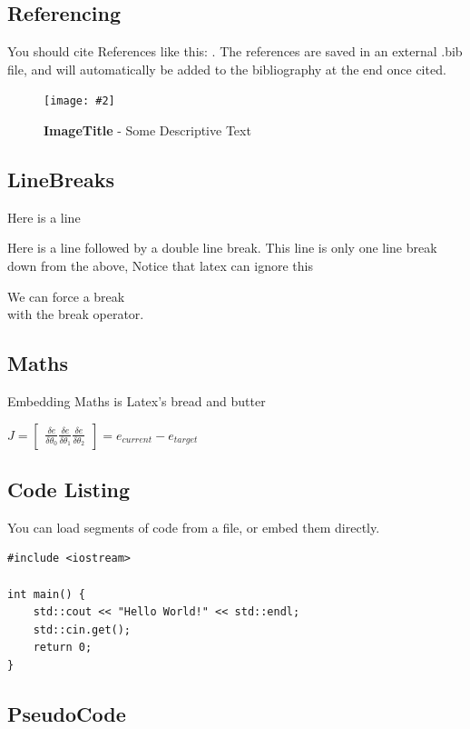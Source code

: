 \documentclass[10pt, a4paper]{article}
\newcommand{\figuremacro}[5]{
    \begin{figure}[#1]
        \centering
        \texttt{[image: \#2]}
        \caption[#3]{\textbf{#3}#4}
        \label{fig:#2}
    \end{figure}
}
\begin{document}
	\subsection{Referencing}
	You should cite References like this: \cite{Keshav}. The references are saved in an external .bib file, and will automatically be added to the bibliography at the end once cited.
	
	\figuremacro{h}{placeholder}{ImageTitle}{ - Some Descriptive Text}{1.0}
	\subsection{LineBreaks}
	Here is a line
    
    Here is a line followed by a double line break.
	This line is only one line break down from the above, Notice that latex can ignore this
    
    We can force a break \\ with the break operator.
    
	\subsection{Maths}
    Embedding Maths is Latex's bread and butter    
    
    {\centering \Large \(
        J = \begin{bmatrix}
            \frac{\delta e}{\delta \theta _0}
            \frac{\delta e}{\delta \theta _1}
            \frac{\delta e}{\delta \theta _2}
        \end{bmatrix}
        = e_{current} - e_{target} 
    \)\par}
	
	\subsection{Code Listing}
    You can load segments of code from a file, or embed them directly.
    
\begin{lstlisting}[caption = Hello World! in c++]
#include <iostream>

int main() {
    std::cout << "Hello World!" << std::endl;
    std::cin.get();
    return 0;
}
\end{lstlisting}


    
\subsection{PseudoCode}
\end{document}
